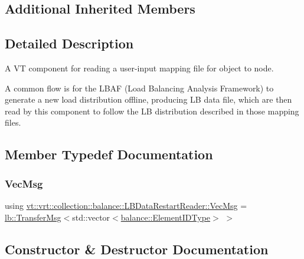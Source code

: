 \subsection*{Additional Inherited Members}


\subsection{Detailed Description}
A VT component for reading a user-\/input mapping file for object to node. 

A common flow is for the L\+B\+AF (Load Balancing Analysis Framework) to generate a new load distribution offline, producing LB data file, which are then read by this component to follow the LB distribution described in those mapping files. 

\subsection{Member Typedef Documentation}
\mbox{\label{structvt_1_1vrt_1_1collection_1_1balance_1_1_l_b_data_restart_reader_ad48bf75b314df0ec9dbcf5c274fef246}} 
\subsubsection{\texorpdfstring{Vec\+Msg}{VecMsg}}
{\footnotesize\ttfamily using \hyperlink{structvt_1_1vrt_1_1collection_1_1balance_1_1_l_b_data_restart_reader_ad48bf75b314df0ec9dbcf5c274fef246}{vt\+::vrt\+::collection\+::balance\+::\+L\+B\+Data\+Restart\+Reader\+::\+Vec\+Msg} =  \hyperlink{structvt_1_1vrt_1_1collection_1_1lb_1_1_transfer_msg}{lb\+::\+Transfer\+Msg}$<$std\+::vector$<$\hyperlink{namespacevt_1_1vrt_1_1collection_1_1balance_a592736f733df4f90856df90a1fd08905}{balance\+::\+Element\+I\+D\+Type}$>$ $>$}



\subsection{Constructor \& Destructor Documentation}
\mbox{\label{structvt_1_1vrt_1_1collection_1_1balance_1_1_l_b_data_restart_reader_a66d7aad803c86006eb72e95d46aa945a}} 

